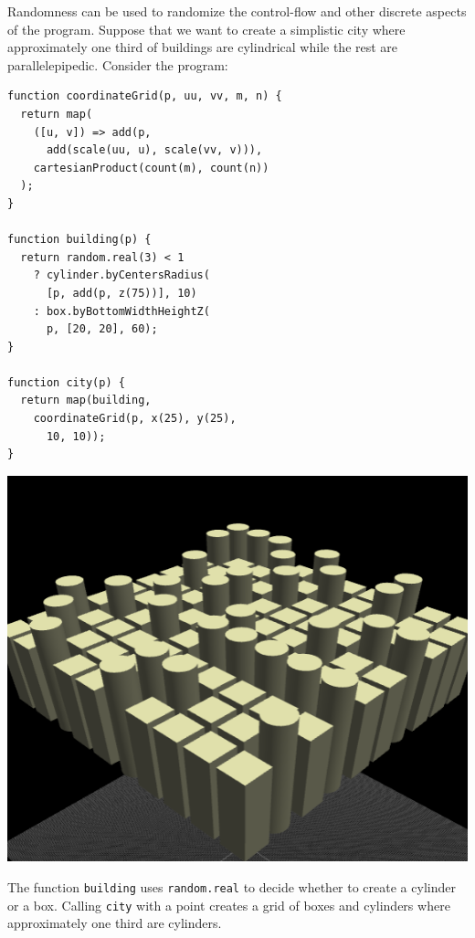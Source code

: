 Randomness can be used to randomize the control-flow and other discrete aspects of the program.
Suppose that we want to create a simplistic city where approximately one third of buildings are cylindrical while the rest are parallelepipedic.
Consider the program:

\noindent
\begin{minipage}{1.0\textwidth}
\begin{minipage}{0.5\textwidth}
\begin{verbatim}
function coordinateGrid(p, uu, vv, m, n) {
  return map(
    ([u, v]) => add(p,
      add(scale(uu, u), scale(vv, v))),
    cartesianProduct(count(m), count(n))
  );
}

function building(p) {
  return random.real(3) < 1
    ? cylinder.byCentersRadius(
      [p, add(p, z(75))], 10)
    : box.byBottomWidthHeightZ(
      p, [20, 20], 60);
}

function city(p) {
  return map(building,
    coordinateGrid(p, x(25), y(25),
      10, 10));
}
\end{verbatim}
\end{minipage}%
\begin{minipage}{0.5\textwidth}
  \includegraphics[width=1.0\textwidth]{./images/detail_examples/box_cyl_city_crop}
\end{minipage}
\end{minipage}

The function {\tt building} uses {\tt random.real} to decide whether to create a cylinder or a box.
Calling {\tt city} with a point creates a grid of boxes and cylinders where approximately one third are cylinders. %

